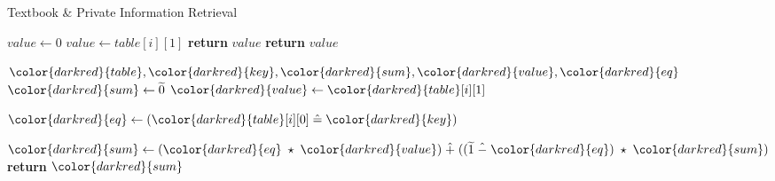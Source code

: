 \begin{algorithm}[H]
\caption{Textbook \& Private Information Retrieval}\label{a:pir}
\begin{algorithmic}[1]
\renewcommand{\algorithmicrequire}{\textbf{Private Vars:}}

    \State $value \gets 0$
            \State $value \gets table[i][1]$
            \State \textbf{return} {$value$} 
        \EndIf
    \EndFor
    \State \textbf{return} {$value$} 
\EndProcedure

\begin{spacing}{0.5}
\end{spacing}

\Require ${\color{darkred}{table}}, {\color{darkred}{key}}, {\color{darkred}{sum}}, {\color{darkred}{value}}, {\color{darkred}{eq}}$
    \State ${\color{darkred}{sum}} \gets \enc{0}$
        \State ${\color{darkred}{value}} \gets {\color{darkred}{table}}[i][1]$

        \State ${\color{darkred}{eq}} \gets ({\color{darkred}{table}}[i][0] \heq {\color{darkred}{key}})$

        \State ${\color{darkred}{sum}} \gets ({\color{darkred}{eq}} \hmul {\color{darkred}{value}}) \hplus ((\enc{1} \hminus {\color{darkred}{eq}}) \hmul {\color{darkred}{sum}})$
    \EndFor
    \State \textbf{return} {${\color{darkred}{sum}}$}
\EndProcedure

\end{algorithmic}
\end{algorithm}
